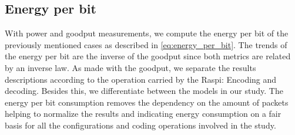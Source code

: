 \subsection{Energy per bit}
With power and goodput measurements, we compute the energy per bit of
the previously mentioned cases as described in \eqref{eq:energy_per_bit}.
The trends of the energy per bit are the inverse of the goodput since
both metrics are related by an inverse law. As made with the goodput, we
separate the results descriptions according to the operation carried by the
\ac{Raspi}: Encoding and decoding. Besides this, we differentiate between
the models in our study. The energy per bit consumption removes the dependency
on the amount of packets helping to normalize the results and indicating
energy consumption on a fair basis for all the configurations and coding
operations involved in the study.

